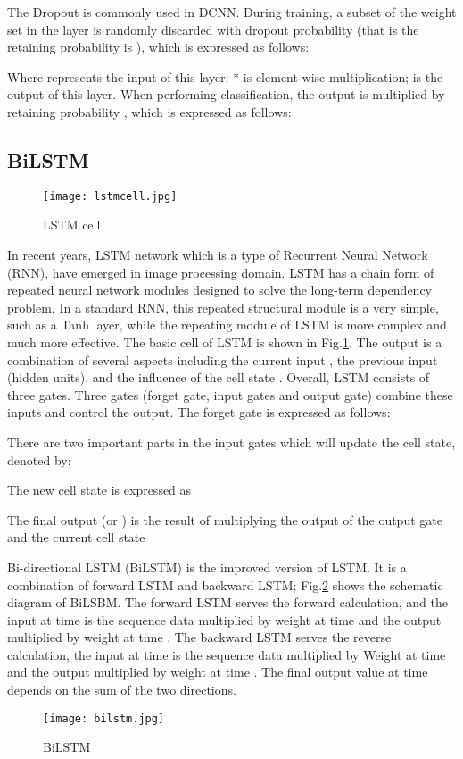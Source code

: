 \documentclass[10pt,twocolumn,letterpaper]{article}
\begin{document}
The Dropout\cite{2014Dropout} is commonly used in DCNN. During training, a subset of the weight set  in the layer is randomly discarded with dropout probability  (that is the retaining probability is ), which is expressed as follows:

Where  represents the input of this layer; * is element-wise multiplication;  is the output of this layer. When performing classification, the output is multiplied by retaining probability , which is expressed as follows:
			
\subsection{BiLSTM}		
\begin{figure}[htbp]
	\begin{center}
		\texttt{[image: lstmcell.jpg]}
	\end{center}
	\caption{LSTM cell}
	\label{lstmcell} 
\end{figure}
In recent years, LSTM network\cite{1997Long,2019Script,UnderstandingLSTM} which is a type of Recurrent Neural Network (RNN), have emerged in image processing domain. LSTM has a chain form of repeated neural network modules designed to solve the long-term dependency problem. In a standard RNN, this repeated structural module is a very simple, such as a Tanh layer, while the repeating module of LSTM is more complex and much more effective. The basic cell of LSTM is shown in Fig.\ref{lstmcell}. The output is a combination of several aspects including the current input , the previous input  (hidden units), and the influence of the cell state . Overall, LSTM consists of three gates. Three gates (forget gate, input gates and output gate) combine these inputs and control the output. The forget gate is expressed as follows:		

There are two important parts in the input gates which will update the cell state, denoted by:

The new cell state  is expressed as 
 
The final output  (or ) is the result of multiplying the output  of the output gate and the current cell state 

Bi-directional LSTM (BiLSTM)\cite{2005Framewise,UnderstandingLSTM} is the improved version of LSTM. It is a combination of forward LSTM and backward LSTM; Fig.\ref{BiLSTM} shows the schematic diagram of BiLSBM. The forward LSTM serves the forward calculation, and the input at time  is the sequence data  multiplied by weight  at time  and the output  multiplied by weight  at time . The backward LSTM serves the reverse calculation, the input  at time  is the sequence data  multiplied by Weight  at time  and the output  multiplied by weight  at time . The final output value at time  depends on the sum of the two directions.
\begin{figure}[htbp]
	\begin{center}
		\texttt{[image: bilstm.jpg]}
	\end{center}
	\caption{BiLSTM}
	\label{BiLSTM}		 
\end{figure}					
 
\end{document}
